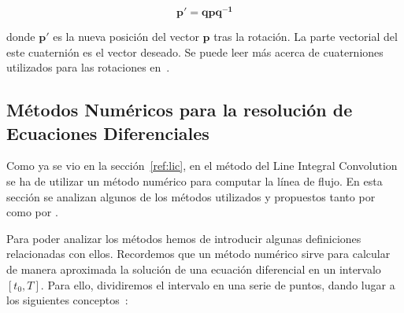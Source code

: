 \[ \boldsymbol{p'} = \boldsymbol{qpq^{-1}} \]

donde $\boldsymbol{p'}$ es la nueva posición del vector $\boldsymbol{p}$ tras la
rotación. La parte vectorial del este cuaternión es el vector deseado. Se puede
leer más acerca de cuaterniones utilizados para las rotaciones en~\citet{Vicci}.

\subsection{Métodos Numéricos para la resolución de Ecuaciones Diferenciales} 
\label{makereference5.4.3}

Como ya se vio en la sección~\ref{ref:lic}, en el método del Line Integral
Convolution se ha de utilizar un método numérico para computar la línea de
flujo. En esta sección se analizan algunos de los métodos utilizados y
propuestos tanto por~\citet{osti_10185520} como por \citet{licthesis}.

Para poder analizar los métodos hemos de introducir algunas definiciones
relacionadas con ellos. Recordemos que un método numérico sirve para calcular de
manera aproximada la solución de una ecuación diferencial en un intervalo $[t_0,
T]$. Para ello, dividiremos el intervalo en una serie de puntos, dando lugar a
los siguientes conceptos~\cite{ANNU}:


